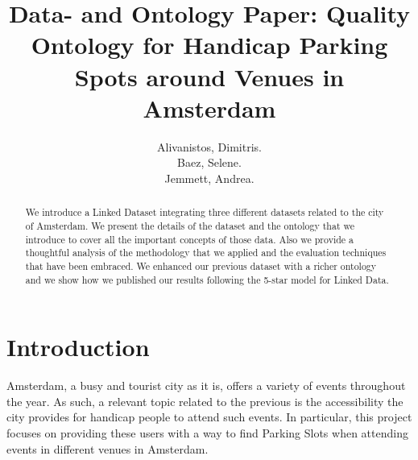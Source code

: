 \documentclass[runningheads,a4paper]{../../StyleFiles/llncs}
\begin{document}
\mainmatter  %

\title{Data- and Ontology Paper: Quality Ontology for Handicap Parking Spots around Venues in Amsterdam}


%
%
\author{Alivanistos, Dimitris. \\ Baez, Selene. \\ Jemmett, Andrea. }
%


\maketitle


\begin{abstract}
We introduce a Linked Dataset integrating three different datasets related to the city of Amsterdam. We present the details of the dataset and the ontology that we introduce to cover all the important concepts of those data. Also we provide a thoughtful analysis of the methodology that we applied and the evaluation techniques that have been embraced. We enhanced our previous dataset with a richer ontology and we show how we published our results following the 5-star model for Linked Data.
\end{abstract}

\section{Introduction}
Amsterdam, a busy and tourist city as it is, offers a variety of events throughout the year. As such, a relevant topic related to the previous is the accessibility the city provides for handicap people to attend such events. In particular, this project focuses on providing these users with a way to find Parking Slots when attending events in different venues in Amsterdam.
\end{document}
